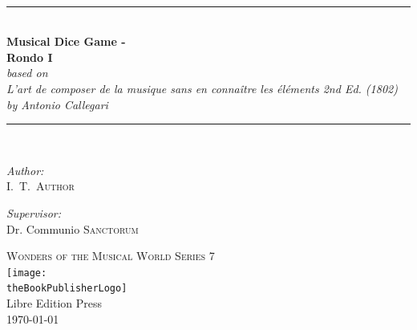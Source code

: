 \documentclass[a4paper,x11names,svgnames,10pt]{article}
\title{\textsc{\mdgBookTitle}}
\author{\textsc{\authorFirstMidNameInit \authorLastName}}
\date{\textsc{\dateGenerated}}
\def\authorFirstMidNameInit{I.\ T.\ }
\def\authorLastName{Author}
\def\dateGenerated{\today}
\def\volNumber{I}
\def\mdgBookTitle{Musical Dice Game - \\[0.15cm] Rondo \volNumber}
\def\mdgBookSubTitle{{\small based on}\\ L'art de composer de la musique sans en connaître les éléments 2nd Ed. (1802) \\[0.15cm] by Antonio Callegari }
\def\theBookSeries{Wonders of the Musical World Series 7}
\def\theBookPublisher{Libre Edition Press}
\def\theBookPublisherLogo{../images/1ed.png}
\newcommand{\HRule}{\rule{\linewidth}{0.5mm}}
\begin{document}


\newpage
{
${}_{}$\\
\vspace{1.00in}	
\thispagestyle{empty}
\begin{center}
	\HRule \\[0.4cm]
	{\huge \bfseries \mdgBookTitle} \\[0.2cm]
	{\large{\em \mdgBookSubTitle} }\\[0.2cm]
	\HRule \\[1.5cm]
	\begin{minipage}{0.4\textwidth}
		\begin{flushleft} \large
			\emph{Author:}\\
			\authorFirstMidNameInit \textsc{\authorLastName}
		\end{flushleft}
	\end{minipage}
	\begin{minipage}{0.4\textwidth}
		\begin{flushright} \large
			\emph{Supervisor:} \\
			Dr. Communio \textsc{Sanctorum}
		\end{flushright}
	\end{minipage}
	\vfill
	{\textsc{\Large \theBookSeries}}  \\[0.2cm] 
	\texttt{[image: \\theBookPublisherLogo]}\\ 
	{\large \theBookPublisher \\
       \dateGenerated }\\
	\vspace{2.50in}
\end{center}
\newpage


\tableofcontents\label{tabofcon}


\baselineskip 14pt

\newpage
}
\end{document}
